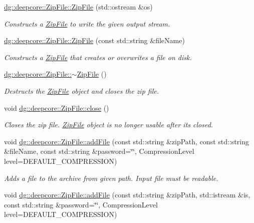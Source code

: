 \begin{DoxyCompactItemize}
\hyperlink{group___utility_module_gaeb5b4a5bdcfb3401601b79d5b2b8d67f}{dg\+::deepcore\+::\+Zip\+File\+::\+Zip\+File} (std\+::ostream \&os)
\begin{DoxyCompactList}\small\item\em Constructs a \hyperlink{classdg_1_1deepcore_1_1_zip_file}{Zip\+File} to write the given output stream. \end{DoxyCompactList}\item 
\hyperlink{group___utility_module_gafa1ff9f05e738574c7ab39179c553a10}{dg\+::deepcore\+::\+Zip\+File\+::\+Zip\+File} (const std\+::string \&file\+Name)
\begin{DoxyCompactList}\small\item\em Constructs a \hyperlink{classdg_1_1deepcore_1_1_zip_file}{Zip\+File} that creates or overwrites a file on disk. \end{DoxyCompactList}\item 
\hyperlink{group___utility_module_ga4a3d14bf12cdc92d728b1bee2ef3afbe}{dg\+::deepcore\+::\+Zip\+File\+::$\sim$\+Zip\+File} ()
\begin{DoxyCompactList}\small\item\em Destructs the \hyperlink{classdg_1_1deepcore_1_1_zip_file}{Zip\+File} object and closes the zip file. \end{DoxyCompactList}\item 
void \hyperlink{group___utility_module_gab6e19571b30242e6604590e978a932ef}{dg\+::deepcore\+::\+Zip\+File\+::close} ()
\begin{DoxyCompactList}\small\item\em Closes the zip file. \hyperlink{classdg_1_1deepcore_1_1_zip_file}{Zip\+File} object is no longer usable after it\textquotesingle{}s closed. \end{DoxyCompactList}\item 
void \hyperlink{group___utility_module_gabe05472ab2b9e7af516484c107dafe5a}{dg\+::deepcore\+::\+Zip\+File\+::add\+File} (const std\+::string \&zip\+Path, const std\+::string \&file\+Name, const std\+::string \&password=\char`\"{}\char`\"{}, Compression\+Level level=D\+E\+F\+A\+U\+L\+T\+\_\+\+C\+O\+M\+P\+R\+E\+S\+S\+I\+ON)
\begin{DoxyCompactList}\small\item\em Adds a file to the archive from given path. Input file must be readable. \end{DoxyCompactList}\item 
void \hyperlink{group___utility_module_ga14fc46ab41bdf091a4e278e941e175a0}{dg\+::deepcore\+::\+Zip\+File\+::add\+File} (const std\+::string \&zip\+Path, std\+::istream \&is, const std\+::string \&password=\char`\"{}\char`\"{}, Compression\+Level level=D\+E\+F\+A\+U\+L\+T\+\_\+\+C\+O\+M\+P\+R\+E\+S\+S\+I\+ON)

\end{DoxyCompactItemize}
